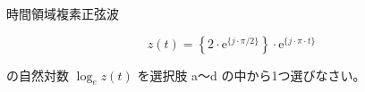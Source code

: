 \noindent 時間領域複素正弦波 

\[
z(t) =  \left \{ 2 \cdot \textrm{e}^{\{ j \cdot \pi/2  \}} \right \} \cdot \textrm{e}^{\{ j \cdot \pi \cdot t \}}
\]

\bigskip
\noindent の自然対数 $\log_e z(t)$ を選択肢 a〜d の中から1つ選びなさい。
